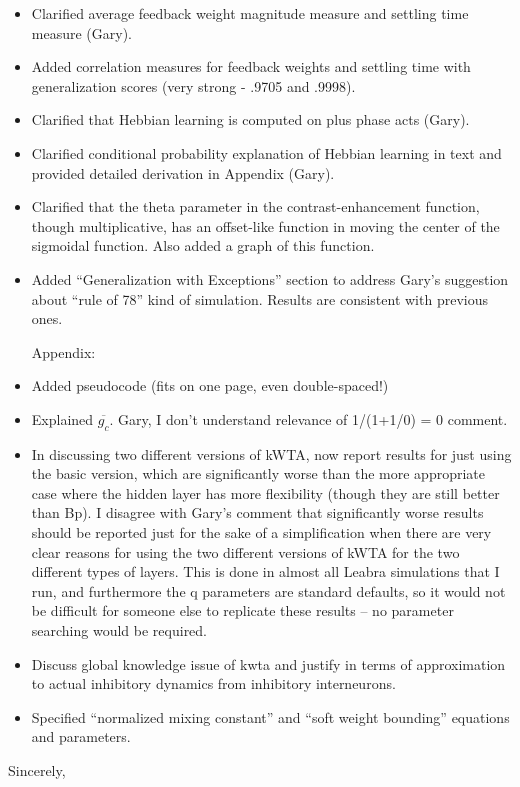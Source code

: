 \documentclass [11pt]{letter}
\begin{document}
\begin{letter}
\begin{itemize}
\item Clarified average feedback weight magnitude measure and settling
  time measure (Gary).

\item Added correlation measures for feedback weights and settling time
  with generalization scores (very strong - .9705 and .9998).

\item Clarified that Hebbian learning is computed on plus phase acts
  (Gary). 
 
\item Clarified conditional probability explanation of Hebbian learning in
  text and provided detailed derivation in Appendix (Gary).

\item Clarified that the theta parameter in the contrast-enhancement
  function, though multiplicative, has an offset-like function in
  moving the center of the sigmoidal function.  Also added a graph of
  this function. 

\item Added ``Generalization with Exceptions'' section to address Gary's
  suggestion about ``rule of 78'' kind of simulation.  Results are
  consistent with previous ones.

Appendix:

\item Added pseudocode (fits on one page, even double-spaced!)

\item Explained $\overline{g_c}$.  Gary, I don't understand relevance of
  1/(1+1/0) = 0 comment.
  
\item In discussing two different versions of kWTA, now report results
  for just using the basic version, which are significantly worse than
  the more appropriate case where the hidden layer has more
  flexibility (though they are still better than Bp).  I disagree with
  Gary's comment that significantly worse results should be reported
  just for the sake of a simplification when there are very clear
  reasons for using the two different versions of kWTA for the two
  different types of layers.  This is done in almost all Leabra
  simulations that I run, and furthermore the q parameters are
  standard defaults, so it would not be difficult for someone else to
  replicate these results -- no parameter searching would be required.

\item Discuss global knowledge issue of kwta and justify in terms of
  approximation to actual inhibitory dynamics from inhibitory
  interneurons.

\item Specified ``normalized mixing constant'' and ``soft weight
  bounding'' equations and parameters.
\end{itemize}



\closing{Sincerely,}

\end{letter}
\end{document}

